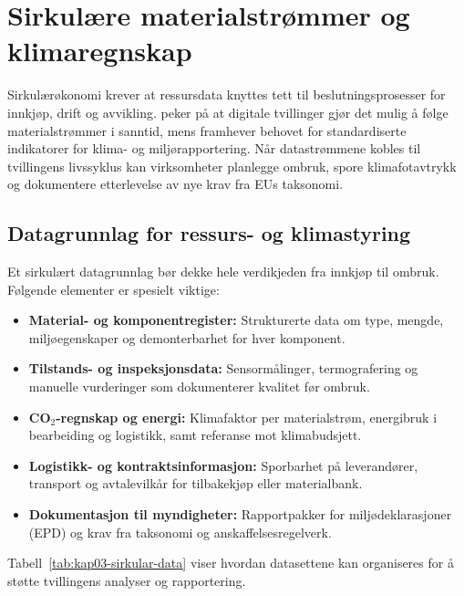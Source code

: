 \section{Sirkulære materialstrømmer og klimaregnskap}
Sirkulærøkonomi krever at ressursdata knyttes tett til beslutningsprosesser for innkjøp, drift og avvikling. \citet{norskindustri2023sirkular}
peker på at digitale tvillinger gjør det mulig å følge materialstrømmer i sanntid, mens \citet{miljodir2023materialstrommer} framhever
behovet for standardiserte indikatorer for klima- og miljørapportering. Når datastrømmene kobles til tvillingens livssyklus kan
virksomheter planlegge ombruk, spore klimafotavtrykk og dokumentere etterlevelse av nye krav fra EUs taksonomi.

\subsection{Datagrunnlag for ressurs- og klimastyring}
Et sirkulært datagrunnlag bør dekke hele verdikjeden fra innkjøp til ombruk. Følgende elementer er spesielt viktige:
\begin{itemize}
    \item \textbf{Material- og komponentregister:} Strukturerte data om type, mengde, miljøegenskaper og demonterbarhet for hver komponent.
    \item \textbf{Tilstands- og inspeksjonsdata:} Sensormålinger, termografering og manuelle vurderinger som dokumenterer kvalitet før ombruk.
    \item \textbf{CO$_2$-regnskap og energi:} Klimafaktor per materialstrøm, energibruk i bearbeiding og logistikk, samt referanse mot klimabudsjett.
    \item \textbf{Logistikk- og kontraktsinformasjon:} Sporbarhet på leverandører, transport og avtalevilkår for tilbakekjøp eller materialbank.
    \item \textbf{Dokumentasjon til myndigheter:} Rapportpakker for miljødeklarasjoner (EPD) og krav fra taksonomi og anskaffelsesregelverk.
\end{itemize}

Tabell~\ref{tab:kap03-sirkular-data} viser hvordan datasettene kan organiseres for å støtte tvillingens analyser og rapportering.

